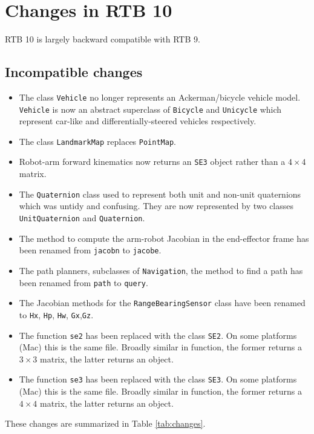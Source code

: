 \documentclass[a4paper,twoside]{report}
\begin{document}
\section{Changes in RTB 10}
RTB 10 is largely backward compatible with RTB 9.

\subsection{Incompatible changes}

\begin{itemize}
\item The class \texttt{Vehicle} no longer represents an Ackerman/bicycle vehicle model.  \texttt{Vehicle} is now an abstract superclass of \texttt{Bicycle} and \texttt{Unicycle} which represent car-like and differentially-steered vehicles respectively.
\item The class \texttt{LandmarkMap} replaces \texttt{PointMap}.
\item Robot-arm forward kinematics now returns an \texttt{SE3} object rather than a $4\times4$ matrix.
\item The \texttt{Quaternion} class used to represent both unit and non-unit quaternions which was untidy and confusing.  They are now represented by two classes \texttt{UnitQuaternion} and \texttt{Quaternion}.
\item The method to compute the arm-robot Jacobian in the end-effector frame has been renamed from \texttt{jacobn} to \texttt{jacobe}.
\item The path planners, subclasses of \texttt{Navigation}, the method to find a path has been renamed from \texttt{path} to  \texttt{query}.
\item The Jacobian methods for the \texttt{RangeBearingSensor} class have been renamed to \texttt{Hx}, \texttt{Hp}, \texttt{Hw}, \texttt{Gx},\texttt{Gz}.
\item The function \texttt{se2} has been replaced with the class \texttt{SE2}.  On some platforms (Mac) this is the same file.  Broadly similar in function, the former returns a $3\times 3$ matrix, the latter returns an object.
\item The function \texttt{se3} has been replaced with the class \texttt{SE3}.  On some platforms (Mac) this is the same file.  Broadly similar in function, the former returns a $4\times 4$ matrix, the latter returns an object.
\end{itemize}

These changes are summarized in Table \ref{tab:changes}.
\end{document}
